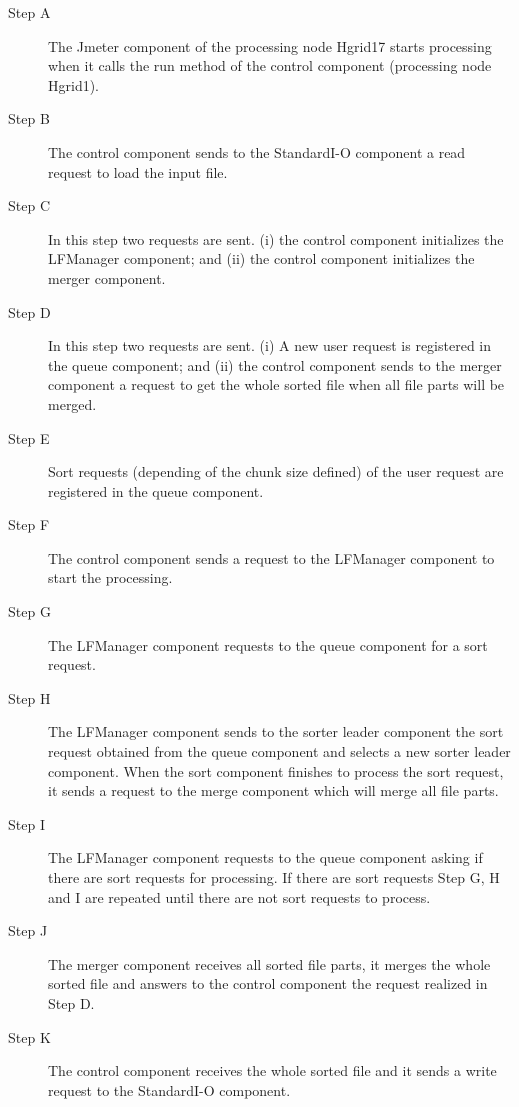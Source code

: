 \begin{description}
	\item [Step A] The Jmeter component of the processing node Hgrid17 starts processing when it calls the run method of the control component (processing node Hgrid1).
	\item [Step B] The control component sends to the StandardI-O component a read request to load the input file.
	\item [Step C] In this step two requests are sent. (i) the control component initializes the LFManager component; and (ii) the control component initializes the merger component.
	\item [Step D] In this step two requests are sent. (i) A new user request is registered in the queue component; and (ii) the control component sends to the merger component a request to get the whole sorted file when all file parts will be merged.
	\item [Step E] Sort requests (depending of the chunk size defined) of the user request are registered in the queue component.
	\item [Step F] The control component sends a request to the LFManager component to start the processing.
	\item [Step G] The LFManager component requests to the queue component for a sort request.
	\item [Step H] The LFManager component sends to the sorter leader component the sort request obtained from the queue component and selects a new sorter leader component. When the sort component finishes to process the sort request, it sends a request to the merge component which will merge all file parts.
	\item [Step I] The LFManager component requests to the queue component asking if there are sort requests for processing. If there are sort requests Step G, H and I are repeated until there are not sort requests to process.
	\item [Step J] The merger component receives all sorted file parts, it merges the whole sorted file and answers to the control component the request realized in Step D.
	\item [Step K] The control component receives the whole sorted file and it sends a write request to the StandardI-O component.
\end{description}

